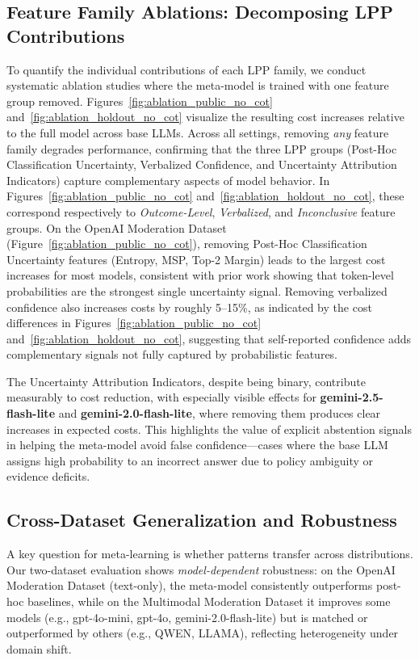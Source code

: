 \subsection{Feature Family Ablations: Decomposing LPP Contributions}
\label{subsec:ablations}
To quantify the individual contributions of each LPP family, we conduct systematic ablation studies where the meta-model is trained with one feature group removed. Figures~\ref{fig:ablation_public_no_cot} and~\ref{fig:ablation_holdout_no_cot} visualize the resulting cost increases relative to the full model across base LLMs.
Across all settings, removing \emph{any} feature family degrades performance, confirming that the three LPP groups (Post-Hoc Classification Uncertainty, Verbalized Confidence, and Uncertainty Attribution Indicators) capture complementary aspects of model behavior.
In Figures~\ref{fig:ablation_public_no_cot} and~\ref{fig:ablation_holdout_no_cot}, these correspond respectively to \emph{Outcome-Level}, \emph{Verbalized}, and \emph{Inconclusive} feature groups.
On the OpenAI Moderation Dataset (Figure~\ref{fig:ablation_public_no_cot}), removing Post-Hoc Classification Uncertainty features (Entropy, MSP, Top-2 Margin) leads to the largest cost increases for most models, consistent with prior work showing that token-level probabilities are the strongest single uncertainty signal.
Removing verbalized confidence also increases costs by roughly 5--15\%, as indicated by the cost differences in Figures~\ref{fig:ablation_public_no_cot} and~\ref{fig:ablation_holdout_no_cot}, suggesting that self-reported confidence adds complementary signals not fully captured by probabilistic features.

The Uncertainty Attribution Indicators, despite being binary, contribute measurably to cost reduction, with especially visible effects for \textbf{gemini-2.5-flash-lite} and \textbf{gemini-2.0-flash-lite}, where removing them produces clear increases in expected costs. This highlights the value of explicit abstention signals in helping the meta-model avoid false confidence—cases where the base LLM assigns high probability to an incorrect answer due to policy ambiguity or evidence deficits.


\subsection{Cross-Dataset Generalization and Robustness}
\label{subsec:generalization}
A key question for meta-learning is whether patterns transfer across distributions. Our two-dataset evaluation shows \textit{model-dependent} robustness: on the OpenAI Moderation Dataset (text-only), the meta-model consistently outperforms post-hoc baselines, while on the Multimodal Moderation Dataset it improves some models (e.g., gpt-4o-mini, gpt-4o, gemini-2.0-flash-lite) but is matched or outperformed by others (e.g., QWEN, LLAMA), reflecting heterogeneity under domain shift.

